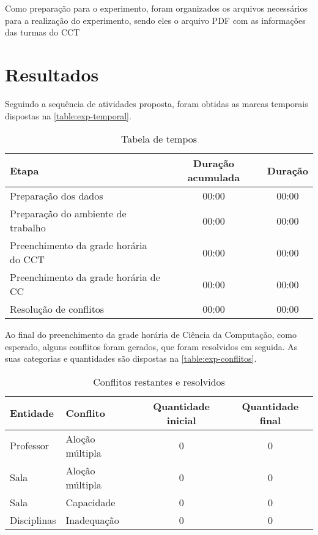 Como preparação para o experimento, foram organizados os arquivos necessários para a realização do experimento, sendo eles o arquivo PDF com as informações das turmas do CCT

\section{Resultados}

Seguindo a sequência de atividades proposta, foram obtidas as marcas temporais dispostas na \autoref{table:exp-temporal}.

\begin{table}[htbp]\centering
  \caption{Tabela de tempos}
  \label{table:exp-temporal}
  \begin{tabular}{| l c c |}
    \hline
    \textbf{Etapa}                        & \textbf{Duração acumulada} & \textbf{Duração} \\
    \hline
    Preparação dos dados                  & 00:00                      & 00:00            \\
    Preparação do ambiente de trabalho    & 00:00                      & 00:00            \\
    Preenchimento da grade horária do CCT & 00:00                      & 00:00            \\
    Preenchimento da grade horária de CC  & 00:00                      & 00:00            \\
    Resolução de conflitos                & 00:00                      & 00:00            \\
    \hline
  \end{tabular}
\end{table}

Ao final do preenchimento da grade horária de Ciência da Computação, como esperado, alguns conflitos foram gerados, que foram resolvidos em seguida. As suas categorias e quantidades são dispostas na \autoref{table:exp-conflitos}.

\begin{table}[htbp]\centering
  \caption{Conflitos restantes e resolvidos}
  \label{table:exp-conflitos}
  \begin{tabular}{| l l c c |}
    \hline
    \textbf{Entidade} & \textbf{Conflito} & \textbf{Quantidade inicial} & \textbf{Quantidade final} \\
    \hline
    Professor         & Aloção múltipla   & 0                           & 0                         \\
    Sala              & Aloção múltipla   & 0                           & 0                         \\
    Sala              & Capacidade        & 0                           & 0                         \\
    Disciplinas       & Inadequação       & 0                           & 0                         \\
    \hline
  \end{tabular}
\end{table}

